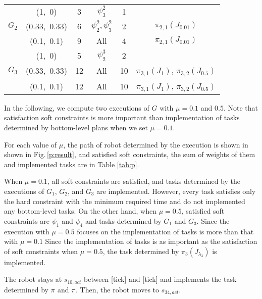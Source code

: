 \documentclass[journal,twoside,web]{IEEEtran}
\newcommand{\rfig}[1]{Fig.\,\ref{#1}}
\newcommand{\tick}{{\sf tick}}
\begin{document}
{\begin{table}[h]
\begin{subfigmatrix}{2}
{\begin{tabular}{c|c|c|c|c|c}
\hline			
			& (1,~0)		& 3 & $\psi^{2}_3$&1  \\
$G_2$ 	& (0.33,~0.33) 		& 6 & $\psi^{2}_2,\psi^{2}_3$&2  &$\pi_{2,1}(J_{0.01})$ \\
			& (0.1,~0.1)	& 9&All   &4  &$\pi_{2,1}(J_{0.01})$ \\
\hline	
			& (1,~0) 		& 5 & $\psi^{3}_2$ &2 \\
$G_3$ 	& (0.33,~0.33) 		& 12 &All&10  &$\pi_{3,1}(J_{1})$, $\pi_{3,2}(J_{0.5})$   \\
			& (0.1,~0.1) 	& 12&All  &10 &$\pi_{3,1}(J_{1})$, $\pi_{3,2}(J_{0.5})$ \\
\end{tabular}\label{tab:mw:bot}}
\end{subfigmatrix}
\end{table}
}
%
In the following, we compute two executions of $G$ with $\mu=0.1$ and $0.5$.
Note that satisfaction soft constraints is more important than implementation of tasks determined by bottom-level plans when we set $\mu=0.1$.

For each value of $\mu$, the path of robot determined by the execution is shown in shown in \rfig{p:result}, and satisfied soft constraints, the sum of weights of them and implemented tasks are in Table \ref{tab:p}.

When $\mu=0.1$, all soft constraints are satisfied, and tasks determined by the executions of $G_1$, $G_2$, and $G_3$ are implemented.
However, every task satisfies only the hard constraint with the minimum required time and do not implemented any bottom-level tasks. 
On the other hand, when $\mu=0.5$, satisfied soft constraints are $\psi_1$ and $\psi_4$ and tasks determined by $G_1$ and $G_3$.
Since the execution with $\mu=0.5$ focuses on the  implementation of tasks is  more than that with $\mu=0.1$
Since the implementation of tasks is as important as the satisfaction of soft constraints when $\mu = 0.5$, the task determined by $\pi_3(J_{\lambda_3})$ is implemented.

The robot stays at $s_{10,act}$ between [\tick] and [\tick] and implements the task determined by $\pi_{}$ and $\pi_{}$.
Then, the robot moves to $s_{34,act}$.
\end{document}
